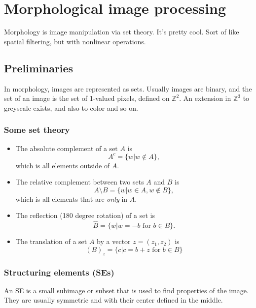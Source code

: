 \section{Morphological image processing}
Morphology is image manipulation via set theory. It's pretty cool. Sort of like spatial filtering, but with nonlinear operations.

\subsection{Preliminaries}
In morphology, images are represented as sets. Usually images are binary, and the set of an image is the set of 1-valued pixels, defined on $\mathbb{Z}^2$. An extension in $\mathbb{Z}^3$ to greyscale exists, and also to color and so on.

\subsubsection{Some set theory}
\begin{itemize}
    \item The absolute complement of a set $A$ is
    \begin{equation}
        A^c = \{ w | w \notin A \},
    \end{equation}
    which is all elements outside of $A$.
    \item The relative complement between two sets $A$ and $B$ is
    \begin{equation}
        A \setminus B = \{ w | w \in A, w \notin B \},
    \end{equation}
    which is all elements that are \emph{only} in $A$.
    \item The reflection (180 degree rotation) of a set is
    \begin{equation}
        \hat{B} = \{ w | w = -b \mbox{ for } b \in B \}.
    \end{equation}
    \item The translation of a set $A$ by a vector $z = (z_1, z_2)$ is
    \begin{equation}
        (B)_z = \{ c | c = b + z \mbox{ for } b \in B \}
    \end{equation}
\end{itemize}

\subsubsection{Structuring elements (SEs)}
An SE is a small subimage or subset that is used to find properties of the image. They are usually symmetric and with their center defined in the middle.

